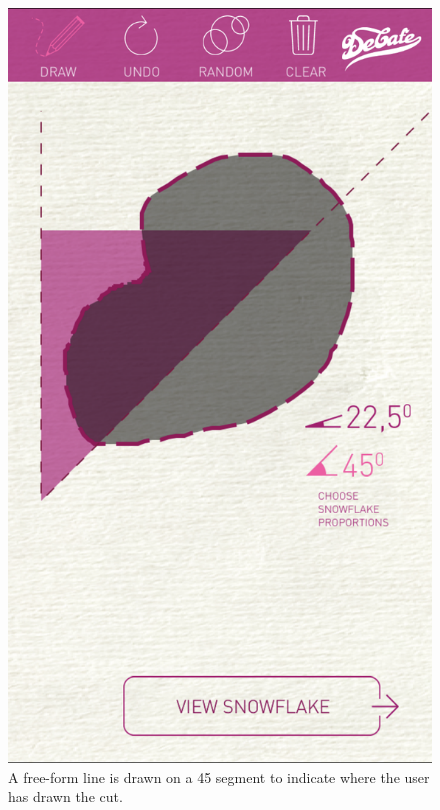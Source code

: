 \documentclass[11pt]{article}
\begin{document}
                 \begin{figure}[!ht]
                        \begin{minipage}{0.45\textwidth}
                            \centering \includegraphics[width=0.7\linewidth]{Images/snowflakeOutline}
                            \caption{A free-form line is drawn on a 45\textdegree{} segment to indicate where the user has drawn the cut.\\\\}
                            \label{fig:snowflakeOutline}
                        \end{minipage}\hfill
                        \begin{minipage}{0.45\textwidth}
                            \centering

\end{minipage}
\end{figure}
\end{document}
